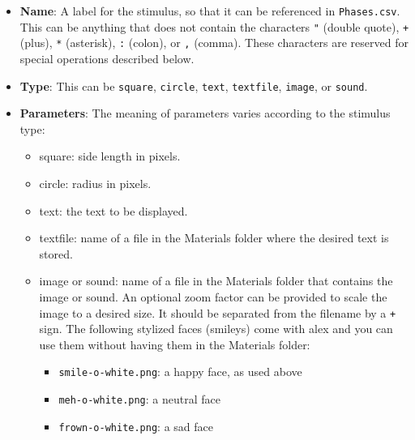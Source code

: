 \documentclass[11pt,]{article}
\begin{document}
\begin{itemize}
\item
  \textbf{Name}: A label for the stimulus, so that it can be referenced
  in \texttt{Phases.csv}. This can be anything that does not contain the
  characters \texttt{"} (double quote), \texttt{+} (plus), \texttt{*}
  (asterisk), \texttt{:} (colon), or \texttt{,} (comma). These
  characters are reserved for special operations described below.
\item
  \textbf{Type}: This can be \texttt{square}, \texttt{circle},
  \texttt{text}, \texttt{textfile}, \texttt{image}, or \texttt{sound}.
\item
  \textbf{Parameters}: The meaning of parameters varies according to the
  stimulus type:

  \begin{itemize}
  \item
    square: side length in pixels.
  \item
    circle: radius in pixels.
  \item
    text: the text to be displayed.
  \item
    textfile: name of a file in the Materials folder where the desired
    text is stored.
  \item
    image or sound: name of a file in the Materials folder that contains
    the image or sound. An optional zoom factor can be provided to scale
    the image to a desired size. It should be separated from the
    filename by a \texttt{+} sign. The following stylized faces
    (smileys) come with alex and you can use them without having them in
    the Materials folder:

    \begin{itemize}
    \item
      \texttt{smile-o-white.png}: a happy face, as used above
    \item
      \texttt{meh-o-white.png}: a neutral face
    \item
      \texttt{frown-o-white.png}: a sad face
    \end{itemize}


\end{itemize}
\end{itemize}
\end{document}
